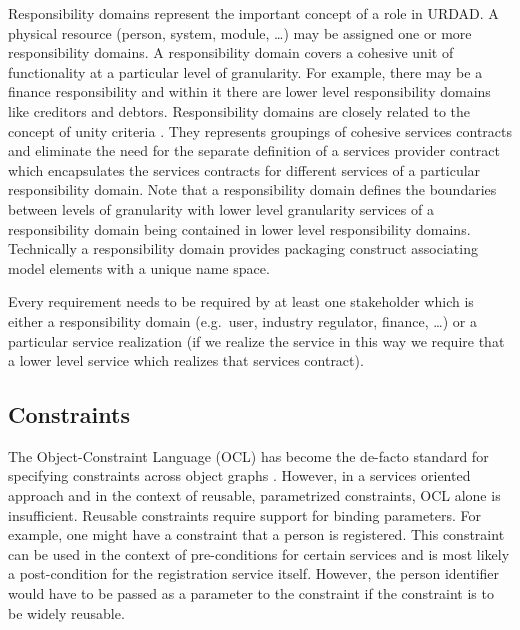 Responsibility domains represent the important concept of a role in URDAD. A physical resource (person, system, module, \dots) may be assigned one or more responsibility domains. A responsibility domain covers a cohesive unit of functionality at a particular level of granularity. For example, there may be a finance responsibility and within it there are lower level responsibility domains like creditors and debtors.  Responsibility domains are closely related to the concept of unity criteria \cite{gonzalez_unity_2009}. They represents groupings of cohesive services contracts and eliminate the need for the separate definition of a services provider contract which encapsulates the services contracts for different services of a particular responsibility domain. Note that a responsibility domain defines the boundaries between levels of granularity with lower level granularity services of a responsibility domain being contained in lower level responsibility domains. Technically a responsibility domain provides packaging construct associating model elements with a unique name space.

Every requirement needs to be required by at least one stakeholder which is either a responsibility domain (e.g.\ user, industry regulator, finance, \dots) or a particular service realization (if we realize the service in this way we require that a lower level service which realizes that services contract).



\subsection{Constraints}

The Object-Constraint Language (OCL) has become the de-facto standard for specifying constraints across object graphs \cite{_object_2010}. However, in a services oriented approach and in the context of reusable, parametrized constraints, OCL alone is insufficient.
Reusable constraints require support for binding parameters. For example, one might have a constraint that a person is registered. This constraint can be used in the context of pre-conditions for certain services and is most likely a post-condition for the registration service itself. However, the person identifier would have to be passed as a parameter to the constraint if the constraint is to be widely reusable.

